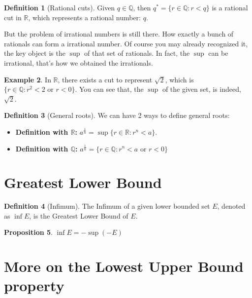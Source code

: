 \documentclass[12pt]{article}
\newcommand{\RR}{\mathbb{R}}   %
\newcommand{\QQ}{\mathbb{Q}}   %
\theoremstyle{definition}
\newtheorem{definition}{Definition}[section]
\newtheorem{example}[definition]{Example}
\theoremstyle{plain}
\newtheorem{proposition}[definition]{Proposition}
\begin{document}
\begin{definition}[Rational cuts]
Given $q \in \QQ$, then $q^* = \{r\in\QQ:r<q\}$ is a rational cut in $\RR$, which represents a rational number: $q$. 
\end{definition}

\begin{note}
But the problem of irrational numbers is still there. How exactly a bunch of rationals can form a irrational number. Of course you may already recognized it, the key object is the $\sup$ of that set of rationals. In fact, the $\sup$ can be irrational, that's how we obtained the irrationals.
\end{note}

\begin{example}
In $\RR$, there exists a cut to represent $\sqrt{2}$, which is $\{r \in \QQ: r^2<2 \text{ or } r<0\}$. You can see that, the $\sup$ of the given set, is indeed, $\sqrt{2}$.
\end{example}

\begin{definition}[General roots]
We can have 2 ways to define general roots:
\begin{itemize}
    \item \textbf{Definition with $\RR$:} $a^{\frac{1}{n}} = \sup\{r\in \RR: r^n<a\}$.

    \item \textbf{Definition with $\QQ$:} $a^{\frac{1}{n}}=\{r \in \QQ: r^{n}<a \text{ or } r<0\}$
\end{itemize}

\end{definition}

\section{Greatest Lower Bound}
\begin{definition}[Infimum]
The Infimum of a given lower bounded set $E$, denoted as $\inf E$, is the Greatest Lower Bound of $E$.
\end{definition}

\begin{proposition}
$\inf E = -\sup(-E)$
\end{proposition}

\section{More on the Lowest Upper Bound property}
\end{document}
